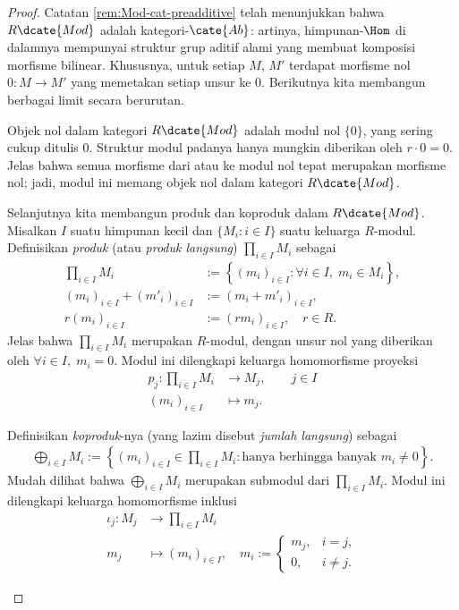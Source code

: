 \begin{proof}
	Catatan \ref{rem:Mod-cat-preadditive} telah menunjukkan bahwa $R\dcate{Mod}$ adalah kategori-$\cate{Ab}$: artinya, himpunan-$\Hom$ di dalamnya mempunyai struktur grup aditif alami yang membuat komposisi morfisme bilinear. Khususnya, untuk setiap $M$, $M'$ terdapat morfisme nol $0: M \to M'$ yang memetakan setiap unsur ke $0$. Berikutnya kita membangun berbagai limit secara berurutan.

	\begin{asparaenum}
		\item Objek nol dalam kategori $R\dcate{Mod}$ adalah modul nol $\{0\}$, yang sering cukup ditulis $0$. Struktur modul padanya hanya mungkin diberikan oleh $r \cdot 0 = 0$. Jelas bahwa semua morfisme dari atau ke modul nol tepat merupakan morfisme nol; jadi, modul ini memang objek nol dalam kategori $R\dcate{Mod}$.

		\item Selanjutnya kita membangun produk dan koproduk dalam $R\dcate{Mod}$. Misalkan $I$ suatu himpunan kecil dan $\{M_i : i \in I\}$ suatu keluarga $R$-modul. Definisikan \emph{produk} (atau \emph{produk langsung}) $\prod_{i \in I} M_i$ sebagai
		\begin{align*}
			\prod_{i \in I} M_i & := \left\{ (m_i)_{i \in I} : \forall i \in I, \; m_i \in M_i \right\}, \\
			(m_i)_{i \in I} + (m'_i)_{i \in I} & := (m_i + m'_i)_{i \in I}, \\
			r(m_i)_{i \in I} & := (rm_i)_{i \in I}, \quad r \in R.
		\end{align*}
		Jelas bahwa $\prod_{i \in I} M_i$ merupakan $R$-modul, dengan unsur nol yang diberikan oleh $\forall i \in I, \; m_i = 0$. Modul ini dilengkapi keluarga homomorfisme proyeksi
		\begin{align*}
			p_j: \prod_{i \in I} M_i & \longrightarrow M_j, \qquad j \in I \\
			(m_i)_{i \in I} & \longmapsto m_j.
		\end{align*}

		Definisikan \emph{koproduk}-nya (yang lazim disebut \emph{jumlah langsung}) sebagai 
		\begin{gather*}
			\bigoplus_{i \in I} M_i := \left\{ (m_i)_{i \in I} \in \prod_{i \in I} M_i : \text{hanya berhingga banyak } m_i \neq 0 \right\}.
		\end{gather*}
		Mudah dilihat bahwa $\bigoplus_{i \in I} M_i$ merupakan submodul dari $\prod_{i \in I} M_i$. Modul ini dilengkapi keluarga homomorfisme inklusi
		\begin{align*}
			\iota_j: M_j & \longrightarrow \prod_{i \in I} M_i \\
			m_j & \longmapsto (m_i)_{i \in I}, \quad m_i :=
			\begin{cases}
				m_j, & i=j, \\
				0, & i \neq j.
			\end{cases}
		\end{align*}


\end{asparaenum}
\end{proof}
